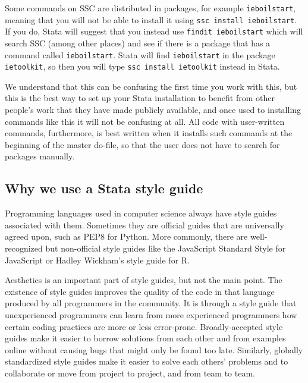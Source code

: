 Some commands on SSC are distributed in packages, for example \texttt{ieboilstart}, meaning that you will
not be able to install it using \texttt{ssc install ieboilstart}. If you do, Stata will suggest that you
instead use \texttt{findit ieboilstart} which will search SSC (among other places) and see if there is a
package that has a command called \texttt{ieboilstart}. Stata will find \texttt{ieboilstart} in the package
\texttt{ietoolkit}, so then you will type \texttt{ssc install ietoolkit} instead in Stata.

We understand that this can be confusing the first time you work with this, but this is the best way to set
up your Stata installation to benefit from other people's work that they have made publicly available, and
once used to installing commands like this it will not be confusing at all.
All code with user-written commands, furthermore, is best written when it installs such commands
at the beginning of the master do-file, so that the user does not have to search for packages manually.

\subsection{Why we use a Stata style guide}

Programming languages used in computer science always have style guides associated with them.
Sometimes they are official guides that are universally agreed upon, such as PEP8 for
Python. More commonly, there are well-recognized but
non-official style guides like the JavaScript Standard Style for
JavaScript or Hadley Wickham's style guide for R.

Aesthetics is an important part of style guides, but not the main point. The existence of style guides
improves the quality of the code in that language produced by all programmers in the community.
It is through a style guide that unexperienced programmers can learn from more experienced programmers
how certain coding practices are more or less error-prone. Broadly-accepted style guides make it easier to
borrow solutions from each other and from examples online without causing bugs that might only be found too
late. Similarly, globally standardized style guides make it easier to solve each others'
problems and to collaborate or move from project to project, and from team to team.

